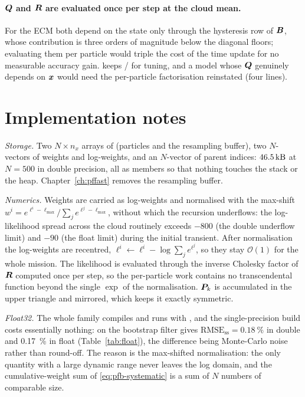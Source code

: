 \paragraph{$\bm{Q}$ and $\bm{R}$ are evaluated once per step at the cloud mean.}
For the ECM both depend on the state only through the hysteresis row of $\bm{B}$, whose contribution
is three orders of magnitude below the diagonal floors; evaluating them per particle would triple
the cost of the time update for no measurable accuracy gain.   keeps
/ for tuning, and a model whose $\bm{Q}$ genuinely depends on $\bm{x}$
would need the per-particle factorisation reinstated (four lines).

\section{Implementation notes}
\emph{Storage.}  Two $N \times n_x$ arrays of  (particles and the resampling buffer),
two $N$-vectors of weights and log-weights, and an $N$-vector of parent indices:
$\SI{46.5}{\kilo\byte}$ at $N=500$ in double precision, all as members so that nothing touches the
stack or the heap.  Chapter~\ref{ch:pffast} removes the resampling buffer.

\emph{Numerics.}  Weights are carried as log-weights and normalised with the max-shift
$w^i = e^{\ell^i - \ell_{\max}} / \sum_j e^{\ell^j-\ell_{\max}}$, without which the recursion
underflows: the log-likelihood spread across the cloud routinely exceeds $-800$ (the double
underflow limit) and $-90$ (the float limit) during the initial transient.  After normalisation the
log-weights are recentred, $\ell^i \leftarrow \ell^i - \log\sum_j e^{\ell^j}$, so they stay
$\mathcal{O}(1)$ for the whole mission.  The likelihood is evaluated through the inverse Cholesky
factor of $\bm{R}$ computed once per step, so the per-particle work contains no transcendental
function beyond the single $\exp$ of the normalisation.  $\bm{P}_k$ is accumulated in the upper
triangle and mirrored, which keeps it exactly symmetric.

\emph{Float32.}  The whole family compiles and runs with , and the
single-precision build costs essentially nothing: on  the bootstrap filter gives
$\mathrm{RMSE}_{\mathrm{ss}} = \SI{0.18}{\percent}$ in double and \SI{0.17}{\percent} in float
(Table~\ref{tab:float}), the difference being Monte-Carlo noise rather than round-off.  The reason is
the max-shifted normalisation: the only quantity with a large dynamic range never leaves the log
domain, and the cumulative-weight sum of \eqref{eq:pfb-systematic} is a sum of $N$ numbers of
comparable size.

